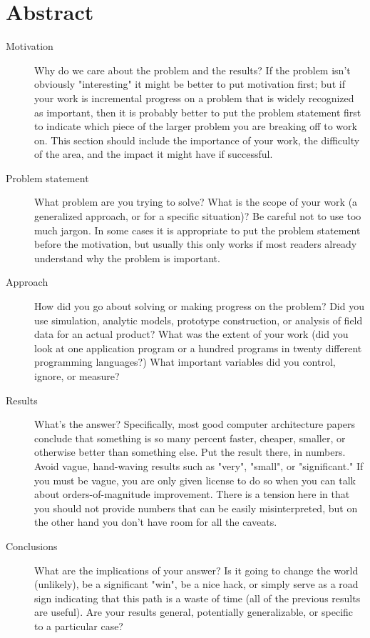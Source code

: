 \chapter*{Abstract}

\begin{description}
  \item[Motivation] Why do we care about the problem and the results?
  If the problem isn't obviously "interesting" it might be better to put
  motivation first; but if your work is incremental progress on a problem that
  is widely recognized as important, then it is probably better to put the
  problem statement first to indicate which piece of the larger problem you are
  breaking off to work on. This section should include the importance of your
  work, the difficulty of the area, and the impact it might have if successful.

  \item[Problem statement] What problem are you trying to solve? What is
  the scope of your work (a generalized approach, or for a specific situation)?
  Be careful not to use too much jargon. In some cases it is appropriate to put
  the problem statement before the motivation, but usually this only works if
  most readers already understand why the problem is important.

  \item[Approach] How did you go about solving or making progress on
  the problem? Did you use simulation, analytic models, prototype construction,
  or analysis of field data for an actual product? What was the extent of your
  work (did you look at one application program or a hundred programs in twenty
  different programming languages?) What important variables did you control,
  ignore, or measure?

  \item[Results] What's the answer? Specifically, most good computer
  architecture papers conclude that something is so many percent faster,
  cheaper, smaller, or otherwise better than something else. Put the result
  there, in numbers. Avoid vague, hand-waving results such as "very", "small",
  or "significant." If you must be vague, you are only given license to do so
  when you can talk about orders-of-magnitude improvement. There is a tension
  here in that you should not provide numbers that can be easily misinterpreted,
  but on the other hand you don't have room for all the caveats.

  \item[Conclusions] What are the implications of your answer? Is it
  going to change the world (unlikely), be a significant "win", be a nice hack,
  or simply serve as a road sign indicating that this path is a waste of time
  (all of the previous results are useful). Are your results general,
  potentially generalizable, or specific to a particular case?
\end{description}